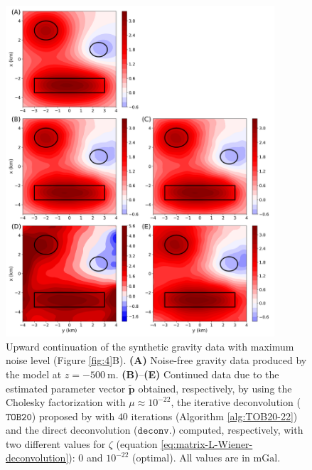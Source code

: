 \begin{figure}[htbp]
	\begin{center}
		\includegraphics[width=10cm]{Fig/grav_upward}
	\end{center}
	\caption{
		Upward continuation of the synthetic gravity data with maximum noise level (Figure \ref{fig:4}B).
		\textbf{(A)} Noise-free gravity data produced by the model at $z = -500 \: \mathrm{m}$. 
		\textbf{(B)}--\textbf{(E)} Continued data due to the estimated parameter vector $\tilde{\mathbf{p}}$ obtained, respectively,
		by using the Cholesky factorization with $\mu \approx 10^{-22}$, 
		the iterative deconvolution ($\mathtt{TOB20}$) proposed by \citet{takahashi-etal2020} with $40$ 
		iterations (Algorithm \ref{alg:TOB20-22}) and
		the direct deconvolution ($\mathtt{deconv.}$) computed, respectively, with two different 
		values for $\zeta$ (equation \ref{eq:matrix-L-Wiener-deconvolution}): $0$ and $10^{-22}$ (optimal).
		All values are in $\mathrm{mGal}$.
		}
	\label{fig:grav_up}
\end{figure}

